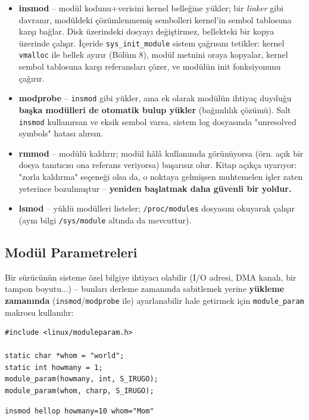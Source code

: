 \documentclass[11pt,a4paper]{article}
\begin{document}
\begin{itemize}[leftmargin=1.2cm]
  \item \textbf{insmod} -- modül kodunu+verisini kernel belleğine
  yükler; bir \emph{linker} gibi davranır, modüldeki çözümlenmemiş
  sembolleri kernel'in sembol tablosuna karşı bağlar. Disk üzerindeki
  dosyayı değiştirmez, bellekteki bir kopya üzerinde çalışır. İçeride
  \texttt{sys\_init\_module} sistem çağrısını tetikler: kernel
  \texttt{vmalloc} ile bellek ayırır (Bölüm 8), modül metnini oraya
  kopyalar, kernel sembol tablosuna karşı referansları çözer, ve
  modülün init fonksiyonunu çağırır.
  \item \textbf{modprobe} -- \texttt{insmod} gibi yükler, ama ek olarak
  modülün ihtiyaç duyduğu \textbf{başka modülleri de otomatik bulup
  yükler} (bağımlılık çözümü). Salt \texttt{insmod} kullanırsan ve
  eksik sembol varsa, sistem log dosyasında "unresolved symbols"
  hatası alırsın.
  \item \textbf{rmmod} -- modülü kaldırır; modül hâlâ kullanımda
  görünüyorsa (örn. açık bir dosya tanıtıcısı ona referans veriyorsa)
  başarısız olur. Kitap açıkça uyarıyor: "zorla kaldırma" seçeneği
  olsa da, o noktaya gelmişsen muhtemelen işler zaten yeterince
  bozulmuştur -- \textbf{yeniden başlatmak daha güvenli bir yoldur.}
  \item \textbf{lsmod} -- yüklü modülleri listeler; \texttt{/proc/modules}
  dosyasını okuyarak çalışır (aynı bilgi \texttt{/sys/module} altında
  da mevcuttur).
\end{itemize}

\subsection{Modül Parametreleri}

Bir sürücünün sisteme özel bilgiye ihtiyacı olabilir (I/O adresi, DMA
kanalı, bir tampon boyutu...) -- bunları derleme zamanında sabitlemek
yerine \textbf{yükleme zamanında} (\texttt{insmod}/\texttt{modprobe}
ile) ayarlanabilir hale getirmek için \texttt{module\_param} makrosu
kullanılır:

\begin{lstlisting}
#include <linux/moduleparam.h>

static char *whom = "world";
static int howmany = 1;
module_param(howmany, int, S_IRUGO);
module_param(whom, charp, S_IRUGO);
\end{lstlisting}

\begin{lstlisting}
insmod hellop howmany=10 whom="Mom"
\end{lstlisting}
\end{document}
